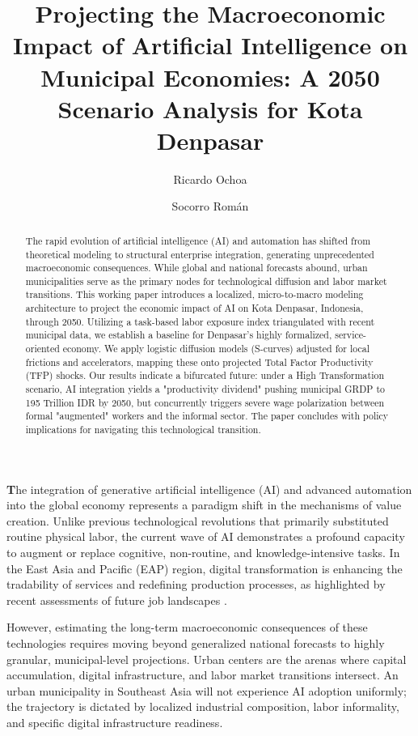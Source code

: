 \documentclass[11pt, a4paper, twocolumn]{article}
\title{Projecting the Macroeconomic Impact of Artificial Intelligence on Municipal Economies: A 2050 Scenario Analysis for Kota Denpasar}
\author[1,2*]{Ricardo Ochoa}
\author[1]{Socorro Román}
\affil[1]{CAPSUS}
\newcommand{\storedsig}{}
\newcommand{\storedcorr}{}
\newcommand{\storedkeys}{}
\newcommand{\storeddates}{}
\newcommand{\dropcap}[1]{\noindent\textbf{\Large #1}}
\let\oldmaketitle\maketitle
\renewcommand{\maketitle}{%
  \oldmaketitle
  \storedsig
  \storedcorr
  \storedkeys
  \storeddates
}
\begin{document}
\maketitle

\begin{abstract}
The rapid evolution of artificial intelligence (AI) and automation has shifted from theoretical modeling to structural enterprise integration, generating unprecedented macroeconomic consequences. While global and national forecasts abound, urban municipalities serve as the primary nodes for technological diffusion and labor market transitions. This working paper introduces a localized, micro-to-macro modeling architecture to project the economic impact of AI on Kota Denpasar, Indonesia, through 2050. Utilizing a task-based labor exposure index triangulated with recent municipal data, we establish a baseline for Denpasar's highly formalized, service-oriented economy. We apply logistic diffusion models (S-curves) adjusted for local frictions and accelerators, mapping these onto projected Total Factor Productivity (TFP) shocks. Our results indicate a bifurcated future: under a High Transformation scenario, AI integration yields a "productivity dividend" pushing municipal GRDP to 195 Trillion IDR by 2050, but concurrently triggers severe wage polarization between formal "augmented" workers and the informal sector. The paper concludes with policy implications for navigating this technological transition.
\end{abstract}

\dropcap{T}he integration of generative artificial intelligence (AI) and advanced automation into the global economy represents a paradigm shift in the mechanisms of value creation. Unlike previous technological revolutions that primarily substituted routine physical labor, the current wave of AI demonstrates a profound capacity to augment or replace cognitive, non-routine, and knowledge-intensive tasks. In the East Asia and Pacific (EAP) region, digital transformation is enhancing the tradability of services and redefining production processes, as highlighted by recent assessments of future job landscapes \cite{worldbank2025}.

However, estimating the long-term macroeconomic consequences of these technologies requires moving beyond generalized national forecasts to highly granular, municipal-level projections. Urban centers are the arenas where capital accumulation, digital infrastructure, and labor market transitions intersect. An urban municipality in Southeast Asia will not experience AI adoption uniformly; the trajectory is dictated by localized industrial composition, labor informality, and specific digital infrastructure readiness.
\end{document}
